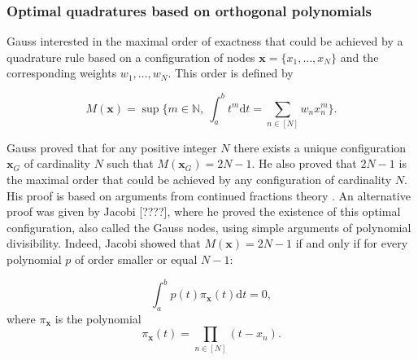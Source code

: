 \documentclass[twoside,11pt]{book}
\begin{document}
\subsubsection{Optimal quadratures based on  orthogonal polynomials}

 Gauss interested in the maximal order of exactness that could be achieved by a quadrature rule based on a configuration of nodes $\bm{x} = \{ x_{1}, \dots, x_{N} \}$ and the corresponding weights $w_{1}, \dots, w_{N}$. This order is defined by 

\begin{equation}
M(\bm{x}) = \sup \{ m \in \mathbb{N}, \: \int_{a}^{b} t^{m} \mathrm{d}t = \sum\limits_{n \in [N]} w_{n}x_{n}^{m} \}.
\end{equation}





Gauss proved that for any positive integer $N$ there exists a unique configuration $\bm{x}_{G}$ of cardinality $N$ such that $M(\bm{x}_{G}) = 2N-1$. He also proved that $2N-1$ is the maximal order that could be achieved by any configuration of cardinality $N$. His proof \citep{Gau1815} is based on arguments from continued fractions theory \citep{Khi97}.
An alternative proof was given by Jacobi [????], where he proved the existence of this optimal configuration, also called the Gauss nodes, using simple arguments of polynomial divisibility. Indeed, Jacobi showed that $M(\bm{x}) = 2N-1$ if and only if for every polynomial $p$ of order smaller or equal $N-1$:

\begin{equation}\label{eq:Legendre_orthogonality}
\int_{a}^{b} p(t) \pi_{\bm{x}}(t) \mathrm{d}t = 0,
\end{equation}
where $\pi_{\bm{x}}$ is the polynomial
\begin{equation}
\pi_{\bm{x}}(t) = \prod\limits_{n \in [N]}(t-x_{n}).
\end{equation}
\end{document}
